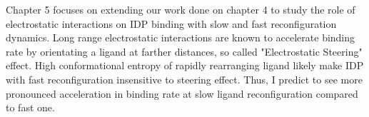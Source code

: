 \documentclass[../talant.diss.submit.tex]{subfiles}
\begin{document}
Chapter 5 focuses on extending our work done on chapter 4 to study the role of electrostatic
interactions on IDP binding with slow and fast reconfiguration dynamics.
Long range electrostatic interactions are known to accelerate binding rate by orientating
a ligand at farther distances, so called "Electrostatic Steering" effect. High conformational
entropy of rapidly rearranging ligand likely make IDP with fast reconfiguration insensitive to
steering effect. Thus, I predict to see more pronounced acceleration in binding rate at slow
ligand reconfiguration compared to fast one.
\end{document}

